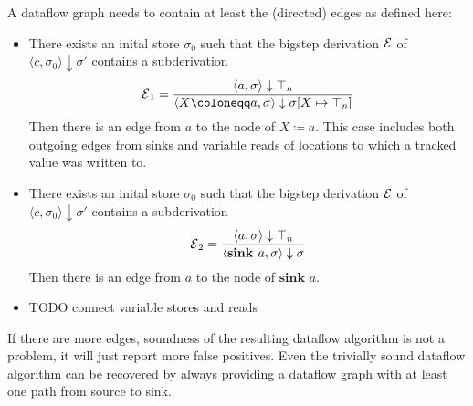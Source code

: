 A dataflow graph needs to contain at least the (directed) edges 
as defined here:
\begin{itemize}
    \item  There exists an inital store $\sigma_0$ such that the
    bigstep derivation $\operatorname{\mathcal{E}}$ 
    of $\langle c, \sigma_0 \rangle \downarrow \sigma'$
    contains a subderivation
    \begin{equation*}
        \E_1 = \ddfrac{\langle a, \sigma \rangle \downarrow \top_n}
        {\langle X \coloneqq a, \sigma \rangle \downarrow
         \sigma[X \mapsto \top_n]}
    \end{equation*}
    Then there is an edge from $a$ to the node of $X \coloneqq a$.
    This case includes both outgoing edges from sinks and variable reads
    of locations to which a tracked value was written to.
    \item  There exists an inital store $\sigma_0$ such that the
    bigstep derivation $\operatorname{\mathcal{E}}$ 
    of $\langle c, \sigma_0 \rangle \downarrow \sigma'$
    contains a subderivation
    \begin{equation*}
        \operatorname{\mathcal{E}}_2 = \frac{\displaystyle \langle a, \sigma \rangle \downarrow \top_n}{\displaystyle \langle \textbf{sink }a, \sigma \rangle \downarrow
         \sigma}
    \end{equation*}
    Then there is an edge from $a$ to the node of $\textbf{sink }a$.
    \item TODO connect variable stores and reads
\end{itemize}

If there are more edges, soundness of the resulting dataflow algorithm
is not a problem, it will just report more false positives.
Even the trivially sound dataflow algorithm can be recovered by always
providing a dataflow graph with at least one path from source to sink.

